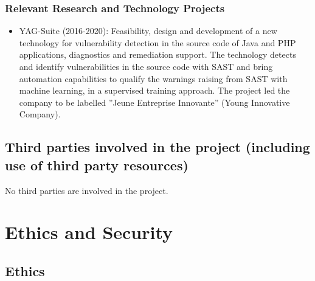 \documentclass[a4paper,11pt]{article}
\begin{document}
\subsubsection*{Relevant Research and Technology Projects}

\begin{itemize}
\item YAG-Suite (2016-2020): Feasibility, design and development of a new technology for vulnerability detection in the source code of Java and PHP applications, diagnostics and remediation support. The technology detects and identify vulnerabilities in the source code with SAST and bring automation capabilities to qualify the warnings raising from SAST with machine learning, in a supervised training approach. The project led the company to be labelled ”Jeune Entreprise Innovante” (Young Innovative Company).
\end{itemize}








\subsection{Third parties involved in the project (including use of third party resources)}

No third parties are involved in the project.


\newpage

\section{Ethics and Security}

\subsection{Ethics}
\end{document}

